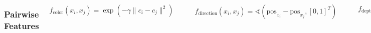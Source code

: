 \documentclass[final,ignorenonframetext,compress]{beamer}
\begin{document}
\begin{frame}
    \begin{columns}[c]
        \frametitle{Pairwise Features}
        \[
        f_\text{color}(x_i, x_j) = \exp\left(-\gamma \lVert c_i - c_j \rVert^2\right)
         \]
            \begin{center}
                \includegraphics[width=.6\linewidth]{images/00062_pipline_feature_pairwise_1_bright}
            \end{center}
        \[
            f_\text{direction}(x_i, x_j) = \sphericalangle(\text{pos}_{x_i} - \text{pos}_{x_j}, [0, 1]^T)
         \]
        \begin{center}
            \includegraphics[width=.6\linewidth]{images/00062_pipline_feature_pairwise_4_bright}
        \end{center}
        \[
            f_\text{depth}(x_i, x_j) = (d_i - d_j) / Z
         \]
        \begin{center}
            \includegraphics[width=.6\linewidth]{images/00062_pipline_feature_pairwise_2_bright}

\end{center}
\end{columns}
\end{frame}
\end{document}
